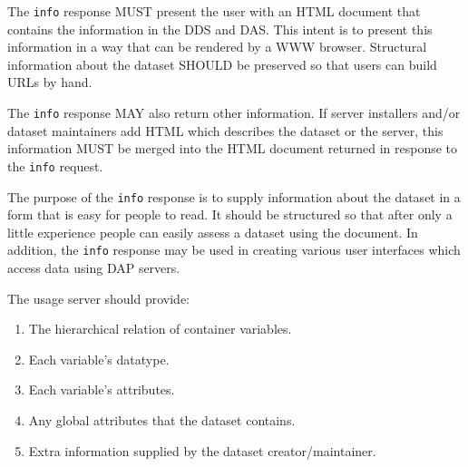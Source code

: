 \documentclass{article}
\begin{document}
The \texttt{info} response MUST present the user with an \ac{HTML} document
that contains the information in the \ac{DDS} and \ac{DAS}. This intent is to
present this information in a way that can be rendered by a \ac{WWW}
browser. Structural information about the dataset SHOULD be preserved so that
users can build URLs by hand.

The \texttt{info} response MAY also return other information. If server
installers and/or dataset maintainers add \ac{HTML} which describes the
dataset or the server, this information MUST be merged into the \ac{HTML}
document returned in response to the \texttt{info} request.

The purpose of the \texttt{info} response is to supply information about the
dataset in a form that is easy for people to read. It should be structured so
that after only a little experience people can easily assess a dataset using
the document. In addition, the \texttt{info} response may be used in creating
various user interfaces which access data using \ac{DAP} servers.

The usage server should provide:
\begin{enumerate}
\item The hierarchical relation of container variables.
\item Each variable's datatype.
\item Each variable's attributes.
\item Any global attributes that the dataset contains.
\item Extra information supplied by the dataset creator/maintainer.
\end{enumerate}
\end{document}
